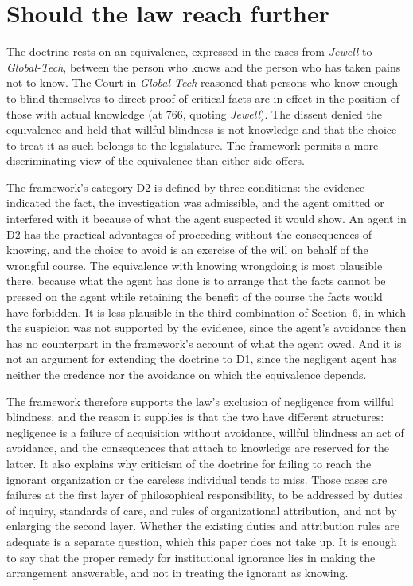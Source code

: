\documentclass[11pt]{article}
\theoremstyle{plain}
\theoremstyle{definition}
\begin{document}
\section{Should the law reach further}

The doctrine rests on an equivalence, expressed in the cases from \emph{Jewell} to \emph{Global-Tech}, between the person who knows and the person who has taken pains not to know. The Court in \emph{Global-Tech} reasoned that persons who know enough to blind themselves to direct proof of critical facts are in effect in the position of those with actual knowledge (at 766, quoting \emph{Jewell}). The dissent denied the equivalence and held that willful blindness is not knowledge and that the choice to treat it as such belongs to the legislature. The framework permits a more discriminating view of the equivalence than either side offers.

The framework's category D2 is defined by three conditions: the evidence indicated the fact, the investigation was admissible, and the agent omitted or interfered with it because of what the agent suspected it would show. An agent in D2 has the practical advantages of proceeding without the consequences of knowing, and the choice to avoid is an exercise of the will on behalf of the wrongful course. The equivalence with knowing wrongdoing is most plausible there, because what the agent has done is to arrange that the facts cannot be pressed on the agent while retaining the benefit of the course the facts would have forbidden. It is less plausible in the third combination of Section~6, in which the suspicion was not supported by the evidence, since the agent's avoidance then has no counterpart in the framework's account of what the agent owed. And it is not an argument for extending the doctrine to D1, since the negligent agent has neither the credence nor the avoidance on which the equivalence depends.

The framework therefore supports the law's exclusion of negligence from willful blindness, and the reason it supplies is that the two have different structures: negligence is a failure of acquisition without avoidance, willful blindness an act of avoidance, and the consequences that attach to knowledge are reserved for the latter. It also explains why criticism of the doctrine for failing to reach the ignorant organization or the careless individual tends to miss. Those cases are failures at the first layer of philosophical responsibility, to be addressed by duties of inquiry, standards of care, and rules of organizational attribution, and not by enlarging the second layer. Whether the existing duties and attribution rules are adequate is a separate question, which this paper does not take up. It is enough to say that the proper remedy for institutional ignorance lies in making the arrangement answerable, and not in treating the ignorant as knowing.
\end{document}
